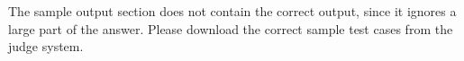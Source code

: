 The sample output section does not contain the correct output,
since it ignores a large part of the answer. 
Please download the correct sample test cases from the judge system.
